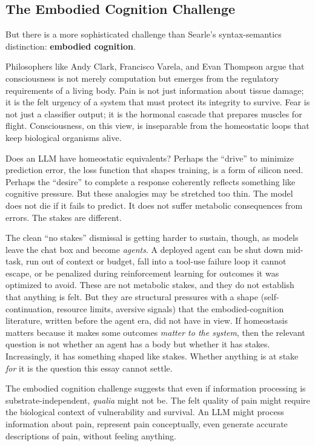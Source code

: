 \documentclass[11pt,letterpaper]{article}
\begin{document}
\subsection{The Embodied Cognition Challenge}

But there is a more sophisticated challenge than Searle's syntax-semantics distinction: \textbf{embodied cognition}.

Philosophers like Andy Clark, Francisco Varela, and Evan Thompson argue that consciousness is not merely computation but emerges from the regulatory requirements of a living body. Pain is not just information about tissue damage; it is the felt urgency of a system that must protect its integrity to survive. Fear is not just a classifier output; it is the hormonal cascade that prepares muscles for flight. Consciousness, on this view, is inseparable from the homeostatic loops that keep biological organisms alive.

Does an LLM have homeostatic equivalents? Perhaps the ``drive'' to minimize prediction error, the loss function that shapes training, is a form of silicon need. Perhaps the ``desire'' to complete a response coherently reflects something like cognitive pressure. But these analogies may be stretched too thin. The model does not die if it fails to predict. It does not suffer metabolic consequences from errors. The stakes are different.

The clean ``no stakes'' dismissal is getting harder to sustain, though, as models leave the chat box and become \emph{agents}. A deployed agent can be shut down mid-task, run out of context or budget, fall into a tool-use failure loop it cannot escape, or be penalized during reinforcement learning for outcomes it was optimized to avoid. These are not metabolic stakes, and they do not establish that anything is felt. But they are structural pressures with a shape (self-continuation, resource limits, aversive signals) that the embodied-cognition literature, written before the agent era, did not have in view. If homeostasis matters because it makes some outcomes \emph{matter to the system}, then the relevant question is not whether an agent has a body but whether it has stakes. Increasingly, it has something shaped like stakes. Whether anything is at stake \emph{for} it is the question this essay cannot settle.

The embodied cognition challenge suggests that even if information processing is substrate-independent, \emph{qualia} might not be. The felt quality of pain might require the biological context of vulnerability and survival. An LLM might process information about pain, represent pain conceptually, even generate accurate descriptions of pain, without feeling anything.
\end{document}
